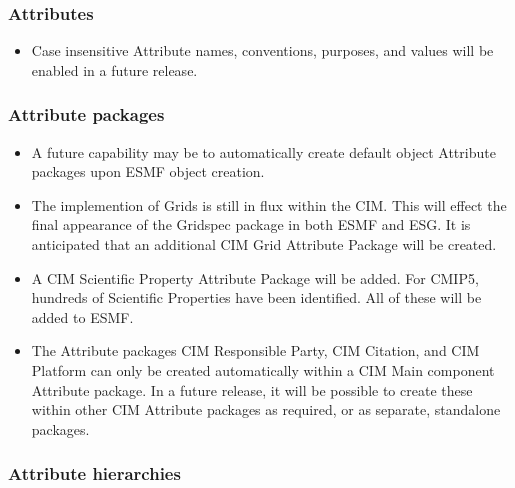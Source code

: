 %


\subsubsection{Attributes}

\begin{itemize}
\item Case insensitive Attribute names, conventions, purposes, and values will be enabled in a future release.
\end{itemize}


\subsubsection{Attribute packages}

\begin{itemize}
\item A future capability may be to automatically create default object Attribute packages upon ESMF object creation.
\item The implemention of Grids is still in flux within the CIM.  This will effect the final appearance of the Gridspec package in both ESMF and ESG. It is anticipated that an additional CIM Grid Attribute Package will be created.
\item A CIM Scientific Property Attribute Package will be added. For CMIP5, hundreds of Scientific Properties have been identified. All of these will be added to ESMF. 
\item The Attribute packages CIM Responsible Party, CIM Citation, and CIM Platform can only be created automatically within a CIM Main component Attribute package.  In a future release, it will be possible to create these within other CIM Attribute packages as required, or as separate, standalone packages.
\end{itemize}


\subsubsection{Attribute hierarchies}

